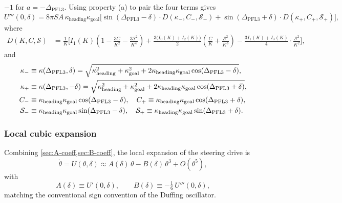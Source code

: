\documentclass[11pt, a4paper]{article}
\newcommand{\kh}{\kappa_{\mathrm{heading}}}
\newcommand{\kg}{\kappa_{\mathrm{goal}}}
\newcommand{\Dp}{\Delta_{\mathrm{PFL3}}}
\begin{document}
$-1$ for $a = -\Dp$.  Using property (a) to pair the four terms gives
%
\begin{equation}
\label{eq:Utriprime-box}
\boxed{
U'''(0, \delta)
  = 8\pi SA\,\kh\kg
    \bigl[
      \sin(\Dp - \delta)\cdot D(\kappa_-, C_-, \mathcal{S}_-)
    + \sin(\Dp + \delta)\cdot D(\kappa_+, C_+, \mathcal{S}_+)
    \bigr],
}
\tag{17}
\end{equation}
%
where
%
\begin{equation}
\label{eq:D-def}
\begin{aligned}
D(K,C,\mathcal{S})
  &= \frac{1}{K}
     \Biggl[
       I_1(K)\left(1 - \frac{3C}{K^2} - \frac{3\mathcal{S}^2}{K^4}\right)
     + \frac{3\bigl(I_0(K) + I_2(K)\bigr)}{2}
       \left(\frac{C}{K} + \frac{\mathcal{S}^2}{K^3}\right)
     - \frac{3I_1(K) + I_3(K)}{4}\cdot\frac{\mathcal{S}^2}{K^2}
     \Biggr],
\end{aligned}
\end{equation}
%
and
%
\begin{align}
\kappa_- &\equiv \kappa(\Dp, \delta)
  = \sqrt{\kh^2 + \kg^2 + 2\kh\kg\cos(\Dp - \delta)}, \notag\\
\kappa_+ &\equiv \kappa(\Dp, -\delta)
  = \sqrt{\kh^2 + \kg^2 + 2\kh\kg\cos(\Dp + \delta)}, \notag\\
C_- &\equiv \kh\kg\cos(\Dp - \delta), \quad
C_+ \equiv \kh\kg\cos(\Dp + \delta), \notag\\
\mathcal{S}_- &\equiv \kh\kg\sin(\Dp - \delta), \quad
\mathcal{S}_+ \equiv \kh\kg\sin(\Dp + \delta).
\label{eq:kappa-pm}
\end{align}

\subsubsection{Local cubic expansion}
\label{sec:cubic}

Combining \cref{sec:A-coeff,sec:B-coeff}, the local expansion of the steering
drive is
%
\begin{equation}
\label{eq:cubic-ode}
\dot{\theta} = U(\theta, \delta)
  \approx A(\delta)\,\theta - B(\delta)\,\theta^3 + O(\theta^5),
\tag{18}
\end{equation}
%
with
%
\begin{equation}
\label{eq:AB-def}
A(\delta) \equiv U'(0, \delta),
\qquad
B(\delta) \equiv -\tfrac{1}{6}\,U'''(0, \delta),
\end{equation}
%
matching the conventional sign convention of the Duffing oscillator.


\end{document}
